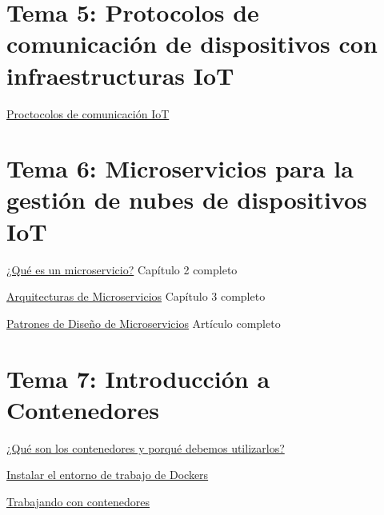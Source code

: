 \documentclass[12pt]{report} %
\begin{document}
\section{Tema 5: Protocolos de comunicación de dispositivos con infraestructuras IoT}
\href{https://learning.oreilly.com/library/view/internet-of-things/9781788470599/b34f5cd8-115c-490c-b5c2-38a3a966a65a.xhtml}{Proctocolos de comunicación IoT}

\section{Tema 6: Microservicios para la gestión de nubes de dispositivos IoT}
\href{https://learning.oreilly.com/library/view/microservices-iot-and/9781484212752/9781484212769_Ch02.xhtml}{¿Qué es un microservicio?} Capítulo 2 completo

\href{https://learning.oreilly.com/library/view/microservices-iot-and/9781484212752/9781484212769_Ch03.xhtml}{Arquitecturas de Microservicios} Capítulo 3 completo

\href{https://towardsdatascience.com/microservice-architecture-and-its-10-most-important-design-patterns-824952d7fa41}{Patrones de Diseño de Microservicios} Artículo completo

\section{Tema 7: Introducción a Contenedores}
\href{https://learning.oreilly.com/library/view/getting-started-with/9781838645700/fb4efc86-2e13-4f11-94be-2485878464ca.xhtml}{¿Qué son los contenedores y porqué debemos utilizarlos?}

\href{https://learning.oreilly.com/library/view/getting-started-with/9781838645700/9f8c7bb0-cd1d-4dc3-8d6b-c08ef3590c44.xhtml}{Instalar el entorno de trabajo de Dockers} 

\href{https://learning.oreilly.com/library/view/getting-started-with/9781838645700/ef53b9f7-3bd4-459e-9665-a53931a3ae0a.xhtml}{Trabajando con contenedores}
\end{document}
